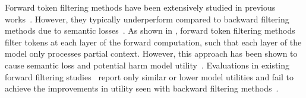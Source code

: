 Forward token filtering methods have been extensively studied in previous works~\cite{DBLP:conf/acl/HouPZWSSZ22,DBLP:conf/acl/ZhongDL0ZDT23,DBLP:journals/corr/abs-2211-11586,DBLP:journals/corr/abs-2401-15293}. However, they typically underperform compared to backward filtering methods due to semantic losses~\cite{DBLP:conf/acl/ZhongDL0ZDT23,DBLP:journals/corr/abs-2211-11586,RHO}. As shown in , forward token filtering methods filter tokens at each layer of the forward computation, such that each layer of the model only processes partial context. However, this approach has been shown to cause semantic loss and potential harm model utility~\cite{DBLP:conf/acl/ZhongDL0ZDT23,DBLP:journals/corr/abs-2211-11586}. Evaluations in existing forward filtering studies~\cite{DBLP:conf/acl/HouPZWSSZ22,DBLP:conf/acl/ZhongDL0ZDT23,DBLP:journals/corr/abs-2211-11586,DBLP:journals/corr/abs-2401-15293} report only similar or lower model utilities and fail to achieve the improvements in utility seen with backward filtering methods~\cite{RHO}.

